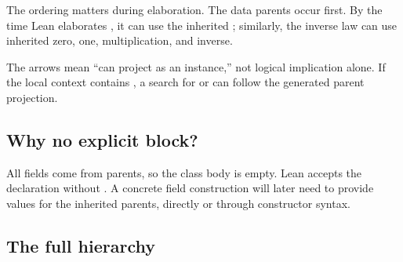\documentclass[11pt]{article}
\newcommand{\code}[1]{\texttt{\detokenize{#1}}}
\begin{document}
The ordering matters during elaboration. The data parents occur first. By the time Lean
elaborates \code{IsAddAssoc F}, it can use the inherited \code{Add F}; similarly, the
inverse law can use inherited zero, one, multiplication, and inverse.

\begin{center}
\end{center}

The arrows mean ``can project as an instance,'' not logical implication alone. If the
local context contains \code{[Field F]}, a search for \code{[Add F]} or
\code{[IsAddAssoc F]} can follow the generated parent projection.

\subsection{Why no explicit \code{where} block?}

All fields come from parents, so the class body is empty. Lean accepts the declaration
without \code{where}. A concrete field construction will later need to provide values
for the inherited parents, directly or through constructor syntax.

\subsection{The full hierarchy}
\end{document}
